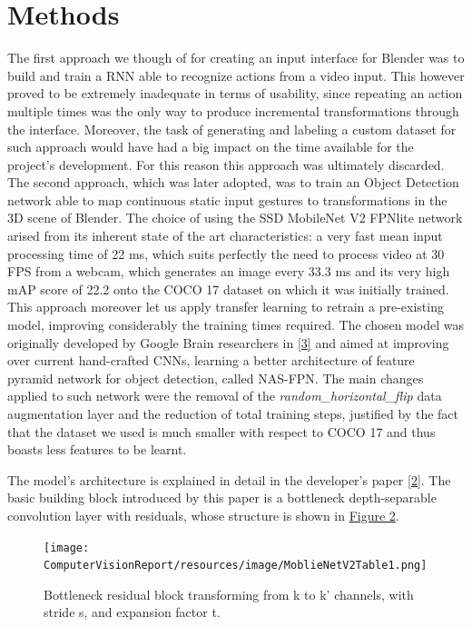 \documentclass[a4paper, 12pt]{article}
\begin{document}
\section{Methods}
\begin{flushleft}
The first approach we though of for creating an input interface for Blender was to build and train a RNN able to recognize actions from a video input. This however proved to be extremely inadequate in terms of usability, since repeating an action multiple times was the only way to produce incremental transformations through the interface. Moreover, the task of generating and labeling a custom dataset for such approach would have had a big impact on the time available for the project's development. For this reason this approach was ultimately discarded.\linebreak
The second approach, which was later adopted, was to train an Object Detection network able to map continuous static input gestures to transformations in the 3D scene of Blender. The choice of using the SSD MobileNet V2 FPNlite network arised from its inherent state of the art characteristics: a very fast mean input processing time of 22 ms, which suits perfectly the need to process video at 30 FPS from a webcam, which generates an image every 33.3 ms and its very high mAP score of 22.2 onto the COCO 17 dataset on which it was initially trained.\linebreak
This approach moreover let us apply transfer learning to retrain a pre-existing model, improving considerably the training times required.
The chosen model was originally developed by Google Brain researchers in \hyperref[Ref1]{[3]} and aimed at improving over current hand-crafted CNNs, learning a better architecture of feature pyramid network for object detection, called NAS-FPN. The main changes applied to such network were the removal of the \textit{random\_horizontal\_flip} data augmentation layer and the reduction of total training steps, justified by the fact that the dataset we used is much smaller with respect to COCO 17 and thus boasts less features to be learnt.\linebreak

The model's architecture is explained in detail in the developer's paper \hyperref[RefArchSSD]{[2]}.
The basic building block introduced by this paper is a bottleneck depth-separable convolution layer with residuals, whose structure is shown in \hyperref[figure2]{Figure 2}.

\begin{figure}[!h]
    \centering
    \texttt{[image: ComputerVisionReport/resources/image/MoblieNetV2Table1.png]} \caption{Bottleneck residual block transforming from k to k' channels, with stride s, and expansion factor t.}
\end{figure}
\label{figure2}


\end{flushleft}
\end{document}
